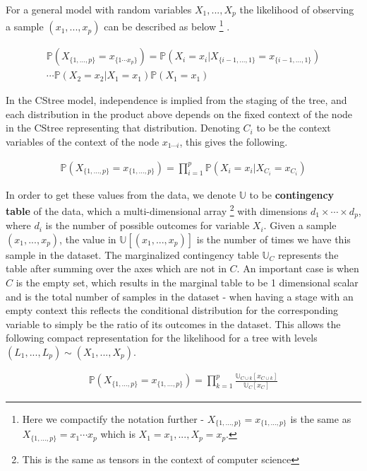 \documentclass{tufte-book}
\begin{document}
For a general model with random variables \(X_1,...,X_p\) the likelihood of observing a sample \((x_1,...,x_p)\) can be described as below  \footnote{Here we compactify the notation further - $X_{\{1,...,p\}}=x_{\{1,...,p\}}$ is the same as $X_{\{1,...,p\}}=x_1\cdots x_p$ which is $X_1=x_1,...,X_p=x_p$.} 
.


\begin{align*}
\mathbb{P}(X_{\{1,...,p\}}=x_{\{1\cdots x_p\}}) =\mathbb{P}(X_i=x_i|X_{\{i-1,...,1\}}=x_{\{i-1,...,1 \}})\\\cdots\mathbb{P}(X_2=x_2|X_1=x_1)\mathbb{P}(X_1=x_1)
\end{align*}

In the CStree model, independence is implied from the staging of the tree, and each distribution in the product above depends on the fixed context of the node in the CStree representing that distribution. Denoting \(C_i\) to be the context variables of the context of the node \(x_{1\cdots i}\), this gives the following.

\begin{align*}
\mathbb{P}(X_{\{1,...,p\}}=x_{\{1,..., p\}}) =\prod_{i=1}^p \mathbb{P}(X_i=x_i|X_{C_i}=x_{C_i})
\end{align*}


In order to get these values from the data, we denote \(\mathbb{U}\) to be \textbf{contingency table} of the data, which a multi-dimensional array  \footnote{This is the same as tensors in the context of computer science}   with dimensions \(d_1 \times \cdots \times d_p\), where \(d_i\) is the number of possible outcomes for variable \(X_i\). Given a sample \((x_1,...,x_p)\), the value in \(\mathbb{U}[(x_1,...,x_p)]\) is the number of times we have this sample in the dataset. The marginalized contingency table \(\mathbb{U}_C\) represents the table after summing over the axes which are not in \(C\). An important case is when \(C\) is the empty set, which results in the marginal table to be 1 dimensional scalar and is the total number of samples in the dataset - when having a stage with an empty context this reflects the conditional distribution for the corresponding variable to simply be the ratio of its outcomes in the dataset. This allows the following compact representation for the likelihood \cite{duarte-2021-repres-contex} for a tree with levels \((L_1,...,L_p) \sim (X_1,...,X_p)\).

\begin{align*}
\mathbb{P}(X_{\{1,...,p\}}=x_{\{1,..., p\}}) = \prod_{k=1}^p \frac{\mathbb{U}_{C \cup k}[x_{C \cup k}]}{\mathbb{U}_{C}[x_{C}]}
\end{align*}
\end{document}
